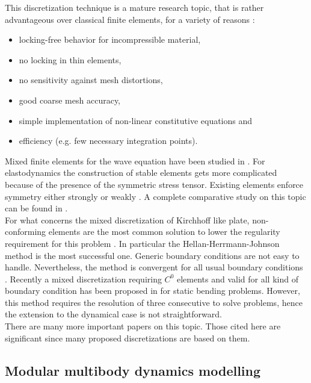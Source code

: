 This discretization technique is a mature research topic, that is rather advantageous over classical finite elements, for a variety of reasons \cite{wriggers2009}:
\begin{itemize}
	\item locking-free behavior for incompressible material,
	\item no locking in thin elements,
	\item no sensitivity against mesh distortions,
	\item good coarse mesh accuracy, 
	\item simple implementation of non-linear constitutive equations and
	\item efficiency (e.g. few necessary integration points).
\end{itemize}

Mixed finite elements for the wave equation have been studied in \cite{geveci1988,becache2000wave}. For elastodynamics the construction of stable elements gets more complicated because of the presence of the symmetric stress tensor. Existing elements enforce symmetry either strongly \cite{becache2001elas,arnold2002mixed} or weakly \cite{arnold2007mixed,arnold2014elastodynamics}. A complete comparative study on this topic can be found in \cite{lee2012mixed}. \\

For what concerns the mixed discretization of Kirchhoff like plate, non-conforming elements are the most common solution to lower the regularity requirement for this problem \cite{arnold1990intro}. In particular the Hellan-Herrmann-Johnson method \cite{hellan1967,herrmann1967finite,johnson1973convergence} is the most successful one. Generic boundary conditions are not easy to handle. Nevertheless, the method is convergent for all usual boundary conditions \cite{blum1990}. Recently a mixed discretization requiring $C^0$ elements and valid for all kind of boundary condition has been proposed in \cite{rafetseder2018siam} for static bending problems. However, this method requires the resolution of three consecutive to solve problems, hence the extension to the dynamical case is not straightforward. \\

There are many more important papers on this topic. Those cited here are significant since many proposed discretizations are based on them.

 
\subsection{Modular multibody dynamics modelling}

